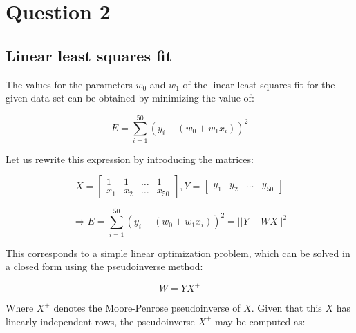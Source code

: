 \documentclass[letterpaper,headings=standardclasses]{scrartcl}
\begin{document}
\section{Question 2}

\subsection{Linear least squares fit}

The values for the parameters $w_0$ and $w_1$ of the linear least squares fit for the given data set can be obtained by minimizing the value of:

$$ E = \sum_{i = 1}^{50} (y_i - (w_0 + w_1 x_i))^2 $$

Let us rewrite this expression by introducing the matrices:

$$ X = \left[ \begin{matrix} 1 & 1 & \dots & 1 \\ x_1 & x_2 & \dots & x_{50} \end{matrix} \right], Y = \left[ \begin{matrix} y_1 & y_2 & \dots & y_{50} \end{matrix} \right] $$

$$ \Rightarrow E = \sum_{i = 1}^{50} (y_i - (w_0 + w_1 x_i))^2 = || Y - WX ||^2 $$

This corresponds to a simple linear optimization problem, which can be solved in a closed form using the pseudoinverse method:

$$ W = YX^{+} $$

Where $X^{+}$ denotes the Moore-Penrose pseudoinverse of $X$. Given that this $X$ has linearly independent rows, the pseudoinverse $X^{+}$ may be computed as:
\end{document}
